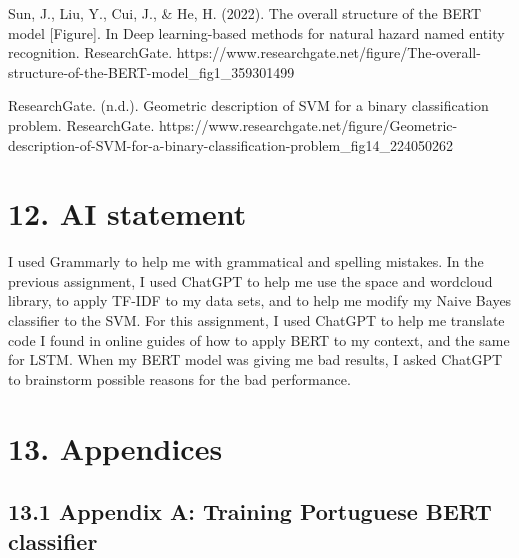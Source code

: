 \documentclass[11pt]{article}
\begin{document}
Sun, J., Liu, Y., Cui, J., \& He, H. (2022). The overall structure of
the BERT model {[}Figure{]}. In Deep learning-based methods for natural
hazard named entity recognition. ResearchGate.
https://www.researchgate.net/figure/The-overall-structure-of-the-BERT-model\_fig1\_359301499

ResearchGate. (n.d.). Geometric description of SVM for a binary
classification problem. ResearchGate.
https://www.researchgate.net/figure/Geometric-description-of-SVM-for-a-binary-classification-problem\_fig14\_224050262

    \section{12. AI statement}\label{ai-statement}

I used Grammarly to help me with grammatical and spelling mistakes. In
the previous assignment, I used ChatGPT to help me use the space and
wordcloud library, to apply TF-IDF to my data sets, and to help me
modify my Naive Bayes classifier to the SVM. For this assignment, I used
ChatGPT to help me translate code I found in online guides of how to
apply BERT to my context, and the same for LSTM. When my BERT model was
giving me bad results, I asked ChatGPT to brainstorm possible reasons
for the bad performance.

    \section{13. Appendices}\label{appendices}

\subsection{13.1 Appendix A: Training Portuguese BERT
classifier}\label{appendix-a-training-portuguese-bert-classifier}
\end{document}
